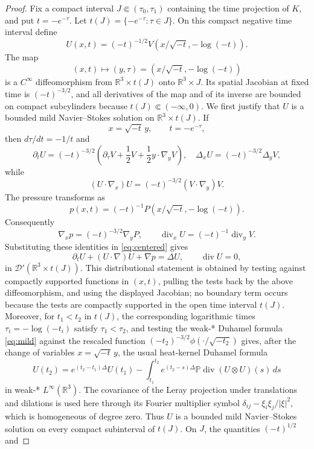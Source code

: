 \documentclass[11pt]{amsart}
\theoremstyle{plain}
\theoremstyle{definition}
\theoremstyle{remark}
\numberwithin{equation}{section}
\begin{document}
\begin{proof}
Fix a compact interval \(J\Subset(\tau_0,\tau_1)\) containing the time
projection of \(K\), and put \(t=-e^{-\tau}\).  Let
\(t(J)=\{-e^{-\tau}:\tau\in J\}\).  On this compact negative time interval
define
\[
   U(x,t)=(-t)^{-1/2}V(x/\sqrt{-t},-\log(-t)).
\]
The map
\[
   (x,t)\longmapsto (y,\tau)=\left(x/\sqrt{-t},-\log(-t)\right)
\]
is a \(C^\infty\) diffeomorphism from
\(\mathbb R^3\times t(J)\) onto \(\mathbb R^3\times J\).  Its spatial
Jacobian at fixed time is \((-t)^{-3/2}\), and all derivatives of the map and
of its inverse are bounded on compact subcylinders because \(t(J)\Subset
(-\infty,0)\).
We first justify that \(U\) is a bounded mild Navier--Stokes solution on
\(\mathbb R^3\times t(J)\).  If
\[
   x=\sqrt{-t}\,y,\qquad t=-e^{-\tau},
\]
then \(d\tau/dt=-1/t\) and
\[
   \partial_t U
   =
   (-t)^{-3/2}
   \left(
      \partial_\tau V
      +\frac12V+\frac12y\cdot\nabla_yV
   \right),
   \quad
   \Delta_xU=(-t)^{-3/2}\Delta_yV,
\]
while
\[
   (U\cdot\nabla_x)U=(-t)^{-3/2}(V\cdot\nabla_y)V .
\]
The pressure transforms as
\[
   p(x,t)=(-t)^{-1}P(x/\sqrt{-t},-\log(-t)).
\]
Consequently
\[
   \nabla_xp=(-t)^{-3/2}\nabla_yP,
   \qquad
   \operatorname{div}_xU=(-t)^{-1}\operatorname{div}_yV .
\]
Substituting these identities in \eqref{eq:centered} gives
\[
   \partial_tU+(U\cdot\nabla)U+\nabla p=\Delta U,
   \qquad \operatorname{div}U=0,
\]
in \(\mathcal D'(\mathbb R^3\times t(J))\).  This distributional statement
is obtained by testing against compactly supported functions in
\((x,t)\), pulling the tests back by the above diffeomorphism, and using the
displayed Jacobian; no boundary term occurs because the tests are compactly
supported in the open time interval \(t(J)\).  Moreover, for
\(t_1<t_2\) in \(t(J)\), the corresponding logarithmic times
\(\tau_i=-\log(-t_i)\) satisfy \(\tau_1<\tau_2\), and testing the weak-*
Duhamel formula \eqref{eq:mild} against the rescaled function
\((-t_2)^{-3/2}\phi(\cdot/\sqrt{-t_2})\) gives, after the change of
variables \(x=\sqrt{-t}\,y\), the usual heat-kernel Duhamel formula
\[
   U(t_2)=e^{(t_2-t_1)\Delta}U(t_1)
   -\int_{t_1}^{t_2}
      e^{(t_2-s)\Delta}\mathbb P\operatorname{div}(U\otimes U)(s)\,ds
\]
in weak-* \(L^\infty(\mathbb R^3)\).  The covariance of the Leray projection
under translations and dilations is used here through its Fourier multiplier
symbol
\(\delta_{ij}-\xi_i\xi_j/|\xi|^2\), which is homogeneous of degree zero.
Thus \(U\) is a bounded mild Navier--Stokes solution on every compact
subinterval of \(t(J)\).  On \(J\), the quantities \((-t)^{1/2}\) and

\end{proof}
\end{document}
